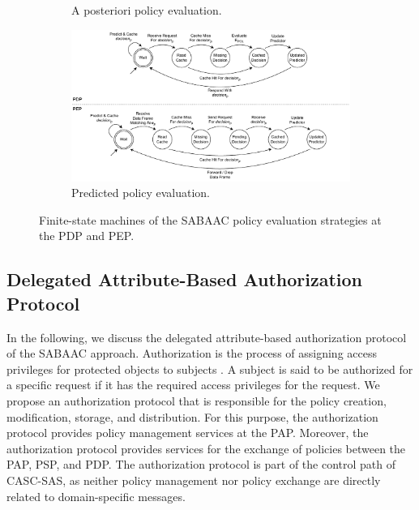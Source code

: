 \begin{figure}
\begin{subfigure}[t]{0.55\linewidth}
        \caption{A posteriori policy evaluation.}
        \label{fig:aposteriori_policy_evaluation_strategy}
        \vspace{1.0\baselineskip}
    \end{subfigure}
    \begin{subfigure}[t]{1.\linewidth}
        \centering
        \includegraphics[width=\linewidth]{figures/predicted_evaluation_strategy.drawio.pdf}
        \caption{Predicted policy evaluation.}
        \label{fig:predicted_policy_evaluation_strategy}
    \end{subfigure}
    \caption{Finite-state machines of the SABAAC policy evaluation strategies at the PDP and PEP.}
    \label{fig:policy_evaluation_strategies}
\end{figure}

\subsection{Delegated Attribute-Based Authorization Protocol}
\label{sec:approach:sabaac:authorization}
In the following, we discuss the delegated attribute-based authorization protocol of the SABAAC approach.
Authorization is the process of assigning access privileges for protected objects to subjects \cite{Eckert2023}.
A subject is said to be authorized for a specific request if it has the required access privileges for the request.
We propose an authorization protocol that is responsible for the policy creation, modification, storage, and distribution.
For this purpose, the authorization protocol provides policy management services at the PAP.
Moreover, the authorization protocol provides services for the exchange of policies between the PAP, PSP, and PDP.
The authorization protocol is part of the control path of CASC-SAS, as neither policy management nor policy exchange are directly related to domain-specific messages.

